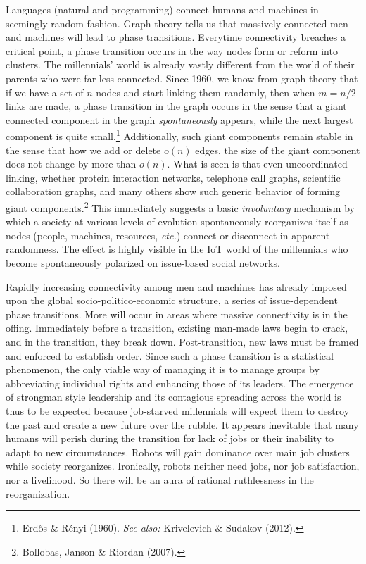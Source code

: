 \begin{multicols}{2}
Languages (natural and programming) connect humans and machines in seemingly random fashion. Graph theory tells us that massively connected men and machines will lead to phase transitions. Everytime connectivity breaches a critical point, a phase transition occurs in the way nodes form or reform into clusters. The millennials' world is already vastly different from the world of their parents who were far less connected. Since 1960, we know from graph theory that if we have a set of $n$ nodes and start linking them randomly, then when $m = n/2$ links are made, a phase transition in the graph occurs in the sense that a giant connected component in the graph \textit{spontaneously} appears, while the next largest component is quite small.\footnote{Erdős \& Rényi (1960). \textit{See also:} Krivelevich \& Sudakov (2012).} Additionally, such giant components remain stable in the sense that how we add or delete $o(n)$ edges, the size of the giant component does not change by more than $o(n)$. What is seen is that even uncoordinated linking, whether protein interaction networks, telephone call graphs, scientific collaboration graphs, and many others show such generic behavior of forming giant components.\footnote{Bollobas, Janson \& Riordan (2007).} This immediately suggests a basic \textit{involuntary} mechanism by which a society at various levels of evolution spontaneously reorganizes itself as nodes (people, machines, resources, \textit{etc.}) connect or disconnect in apparent randomness. The effect is highly visible in the IoT world of the millennials who become spontaneously polarized on issue-based social networks.

Rapidly increasing connectivity among men and machines has already imposed upon the global socio-politico-economic structure, a series of issue-dependent phase transitions. More will occur in areas where massive connectivity is in the offing. Immediately before a transition, existing man-made laws begin to crack, and in the transition, they break down. Post-transition, new laws must be framed and enforced to establish order. Since such a phase transition is a statistical phenomenon, the only viable way of managing it is to manage groups by abbreviating individual rights and enhancing those of its leaders. The emergence of strongman style leadership and its contagious spreading across the world is thus to be expected because job-starved millennials will expect them to destroy the past and create a new future over the rubble. It appears inevitable that many humans will perish during the transition for lack of jobs or their inability to adapt to new circumstances. Robots will gain dominance over main job clusters while society reorganizes. Ironically, robots neither need jobs, nor job satisfaction, nor a livelihood. So there will be an aura of rational ruthlessness in the reorganization.\\[-15pt]


\end{multicols}
